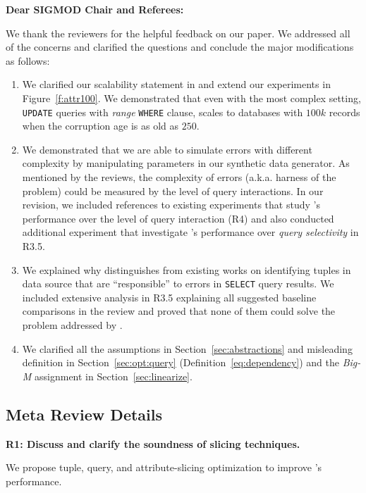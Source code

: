 \noindent \textbf{Dear SIGMOD Chair and Referees:}

We thank the reviewers for the helpful feedback on our paper. We addressed all of the concerns and clarified the questions and conclude the major modifications as follows:
\begin{enumerate}
\item We clarified our scalability statement in and extend our experiments in Figure~\ref{f:attr100}. We demonstrated that even with the most complex setting, \texttt{UPDATE} queries with \textit{range} \texttt{WHERE} clause, \sys scales to databases with $100k$ records when the corruption age is as old as $250$. 
\item We demonstrated that we are able to simulate errors with different complexity by manipulating parameters in our synthetic data generator. As mentioned by the reviews, the complexity of errors (a.k.a. harness of the problem) could be measured by the level of query interactions. In our revision, we included references to existing experiments that study \sys's performance over the level of query interaction (R4) and also conducted additional experiment that investigate \sys's performance over \textit{query selectivity} in R3.5. 
\item We explained why \sys distinguishes from existing works on identifying tuples in data source that are ``responsible'' to errors in \texttt{SELECT} query results. We included extensive analysis in R3.5 explaining all suggested baseline comparisons in the review and proved that none of them could solve the problem addressed by \sys. 
\item We clarified all the assumptions in Section~\ref{sec:abstractions} and misleading definition in Section~\ref{sec:opt:query} (Definition~\ref{eq:dependency}) and the \textit{Big-M} assignment in Section~\ref{sec:linearize}.
\end{enumerate}

\subsection*{Meta Review Details}
\noindent \textbf{R1: Discuss and clarify the soundness of slicing techniques.} 

We propose tuple, query, and attribute-slicing optimization to improve \sys's performance. 

